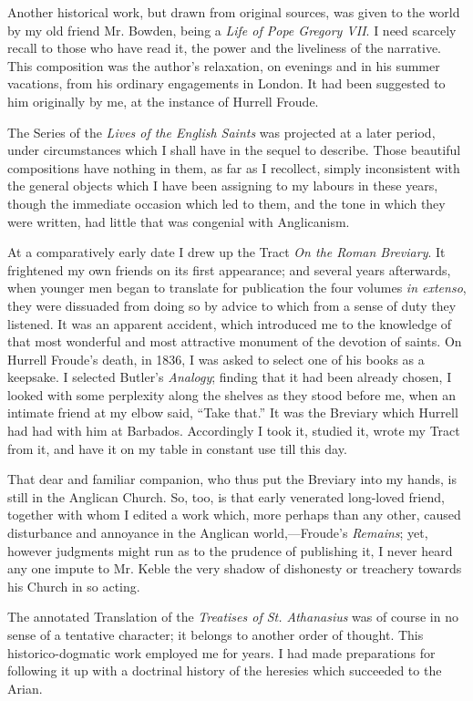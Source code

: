 Another historical work, but drawn from original sources, was given
to the world by my old friend Mr. Bowden, being a \emph{Life of Pope Gregory
VII}. I need scarcely recall to those who have read it, the power and the
liveliness of the narrative. This composition was the author's
relaxation, on evenings and in his summer vacations, from his ordinary
engagements in London. It had been suggested to him originally by me, at
the instance of Hurrell Froude.

The Series of the \emph{Lives of the English Saints} was projected at a
later period, under circumstances which I shall have in the sequel to
describe. Those beautiful compositions have nothing in them, as far as I
recollect, simply inconsistent with the general objects which I have
been assigning to my labours in these years, though the immediate
occasion which led to them, and the tone in which they were
written, had little that was
congenial with Anglicanism.

At a comparatively early date I drew up the Tract \emph{On the Roman
Breviary}. It frightened my own friends on its first appearance; and
several years afterwards, when younger men began to translate for
publication the four volumes \emph{in extenso}, they were dissuaded from
doing so by advice to which from a sense of duty they listened. It was
an apparent accident, which introduced me to the knowledge of that most
wonderful and most attractive monument of the devotion of saints. On
Hurrell Froude's death, in 1836, I was asked to select one of his books
as a keepsake. I selected Butler's \emph{Analogy}; finding that it had been
already chosen, I looked with some perplexity along the shelves as they
stood before me, when an intimate friend at my elbow said, ``Take
that.'' It was the Breviary which Hurrell had had with him at
Barbados. Accordingly I took it, studied it, wrote my Tract
from it, and have it on my table in constant use till this day.

That dear and familiar companion, who thus put the Breviary
into my hands, is still in the Anglican Church. So, too, is that early
venerated long-loved friend, together with whom I edited a work which,
more perhaps than any other, caused disturbance and annoyance in the
Anglican world,—Froude's \emph{Remains}; yet, however
judgments might run as to the prudence of publishing it, I never
heard any one impute to Mr. Keble the very shadow of dishonesty or
treachery towards his Church in so acting.

The annotated Translation of the \emph{Treatises of St. Athanasius}
was of course in no sense of a tentative character; it belongs to
another order of thought. This historico-dogmatic work employed me for
years. I had made preparations for following it up with a doctrinal
history of the heresies which succeeded to the Arian.

